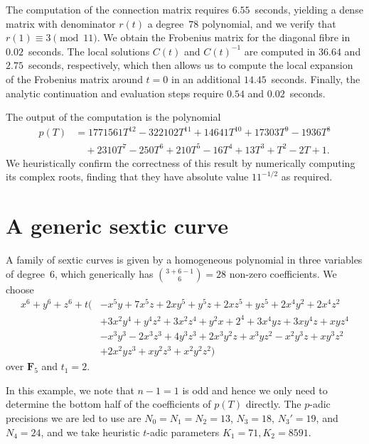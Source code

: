 The computation of the connection matrix requires $6.55$~seconds, 
yielding a dense matrix with denominator $r(t)$ a degree~$78$ 
polynomial, and we verify that $r(1) \equiv 3 \pmod{11}$.  We obtain 
the Frobenius matrix for the diagonal fibre in $0.02$~seconds.  The 
local solutions $C(t)$ and $C(t)^{-1}$ are computed in $36.64$ and 
$2.75$~seconds, respectively, which then allows us to compute the 
local expansion of the Frobenius matrix around $t = 0$ in an additional 
$14.45$~seconds.  Finally, the analytic continuation and evaluation steps 
require $0.54$ and $0.02$~seconds.

The output of the computation is the polynomial 
\begin{align*}
p(T) & = 1771561 T^{12}-322102 T^{11}+14641 T^{10}+17303 T^9-1936 T^8 \\
     & \quad +2310 T^7-250 T^6+210 T^5-16 T^4+13 T^3+T^2-2 T+1.
\end{align*}
We heuristically confirm the correctness of this result by 
numerically computing its complex roots, finding that they 
have absolute value $11^{-1/2}$ as required.

\section{A generic sextic curve}

A family of sextic curves is given by a homogeneous polynomial 
in three variables of degree~$6$, which generically has 
$\binom{3+6-1}{6} = 28$ non-zero coefficients.  We choose 
\begin{equation*}
\begin{split}
x^6 + y^6 + z^6 + t \bigl( 
& - x^5 y + 7 x^5 z + 2 x y^5 + y^5 z + 2 x z^5 + y z^5 + 2 x^4 y^2 + 2 x^4 z^2 \\
& + 3 x^2 y^4 + y^4 z^2 + 3 x^2 z^4 + y^2 x + 2^4 + 3 x^4 y z + 3 x y^4 z + x y z^4 \\
& - x^3 y^3 - 2 x^3 z^3 + 4 y^3 z^3 + 2 x^3 y^2 z + x^3 y z^2 - x^2 y^3 z + x y^3 z^2 \\
& + 2 x^2 y z^3 + x y^2 z^3 + x^2 y^2 z^2 \bigr)
\end{split}
\end{equation*}
over $\mathbf{F}_{5}$ and $t_1 = 2$.

In this example, we note that $n-1 = 1$ is odd and hence we only need 
to determine the bottom half of the coefficients of $p(T)$ directly.  
The $p$-adic precisions we are led to use are $N_0 = N_1 = N_2 = 13$, 
$N_3 = 18$, $N_3' = 19$, and $N_4 = 24$, and we take heuristic $t$-adic 
parameters $K_1 = 71, K_2 = 8591$.

